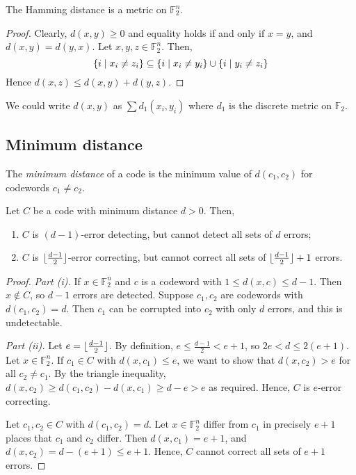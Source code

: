 \begin{lemma}
    The Hamming distance is a metric on \( \mathbb F_2^n \).
\end{lemma}
\begin{proof}
    Clearly, \( d(x,y) \geq 0 \) and equality holds if and only if \( x = y \), and \( d(x,y) = d(y,x) \).
    Let \( x, y, z \in \mathbb F_2^n \).
    Then,
    \[ \qty{i \mid x_i \neq z_i} \subseteq \qty{i \mid x_i \neq y_i} \cup \qty{i \mid y_i \neq z_i} \]
    Hence \( d(x,z) \leq d(x,y) + d(y,z) \).
\end{proof}
\begin{remark}
    We could write \( d(x,y) \) as \( \sum d_1(x_i,y_i) \) where \( d_1 \) is the discrete metric on \( \mathbb F_2 \).
\end{remark}

\subsection{Minimum distance}
\begin{definition}
    The \emph{minimum distance} of a code is the minimum value of \( d(c_1, c_2) \) for codewords \( c_1 \neq c_2 \).
\end{definition}
\begin{lemma}
    Let \( C \) be a code with minimum distance \( d > 0 \).
    Then,
    \begin{enumerate}
        \item \( C \) is \( (d-1) \)-error detecting, but cannot detect all sets of \( d \) errors;
        \item \( C \) is \( \lfloor\frac{d-1}{2}\rfloor \)-error correcting, but cannot correct all sets of \( \lfloor\frac{d-1}{2}\rfloor + 1 \) errors.
    \end{enumerate}
\end{lemma}
\begin{proof}
    \emph{Part (i).}
    If \( x \in \mathbb F_2^n \) and \( c \) is a codeword with \( 1 \leq d(x,c) \leq d - 1 \).
    Then \( x \not\in C \), so \( d - 1 \) errors are detected.
    Suppose \( c_1, c_2 \) are codewords with \( d(c_1, c_2) = d \).
    Then \( c_1 \) can be corrupted into \( c_2 \) with only \( d \) errors, and this is undetectable.

    \emph{Part (ii).}
    Let \( e = \lfloor\frac{d-1}{2}\rfloor \).
    By definition, \( e \leq \frac{d-1}{2} < e + 1 \), so \( 2e < d \leq 2(e+1) \).
    Let \( x \in \mathbb F_2^n \).
    If \( c_1 \in C \) with \( d(x,c_1) \leq e \), we want to show that \( d(x,c_2) > e \) for all \( c_2 \neq c_1 \).
    By the triangle inequality, \( d(x,c_2) \geq d(c_1,c_2) - d(x,c_1) \geq d - e > e \) as required.
    Hence, \( C \) is \( e \)-error correcting.

    Let \( c_1, c_2 \in C \) with \( d(c_1, c_2) = d \).
    Let \( x \in \mathbb F_2^n \) differ from \( c_1 \) in precisely \( e + 1 \) places that \( c_1 \) and \( c_2 \) differ.
    Then \( d(x,c_1) = e + 1 \), and \( d(x,c_2) = d - (e+1) \leq e + 1 \).
    Hence, \( C \) cannot correct all sets of \( e + 1 \) errors.
\end{proof}
